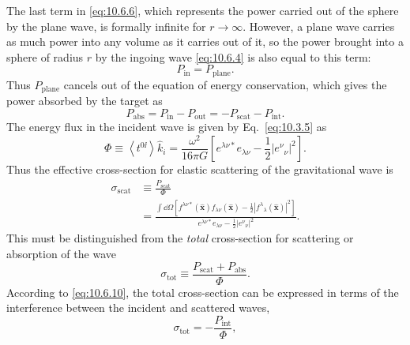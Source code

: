 The last term in \eqref{eq:10.6.6}, which represents the power carried out
of the sphere by the plane wave, is formally infinite for \(r\to\infty\).
However, a plane wave carries as much power into any volume as it carries out
of it, so the power brought into a sphere of radius \(r\) by the ingoing wave
\eqref{eq:10.6.4} is also equal to this term:
\begin{equation}
  P_{\mathrm{in}}=P_{\mathrm{plane}}.
  \tag{10.6.9}\label{eq:10.6.9}
\end{equation}
Thus \(P_{\mathrm{plane}}\) cancels out of the equation of energy conservation,
which gives the power absorbed by the target as
\begin{equation}
  P_{\mathrm{abs}}
  =
  P_{\mathrm{in}}-P_{\mathrm{out}}
  =
  -P_{\mathrm{scat}}-P_{\mathrm{int}}.
  \tag{10.6.10}\label{eq:10.6.10}
\end{equation}
The energy flux in the incident wave is given by Eq.~\eqref{eq:10.3.5} as
\begin{equation}
  \Phi
  \equiv
  \left\langle t^{0\ii}\right\rangle\widehat k_i
  =
  \frac{\omega^2}{16\pi G}
  \left[
    e^{\lambda\nu*}e_{\lambda\nu}
    -\frac12\left|e^\nu{}_\nu\right|^2
  \right].
  \tag{10.6.11}\label{eq:10.6.11}
\end{equation}
Thus the effective cross-section for elastic scattering of the gravitational
wave is
\begin{equation}
  \begin{split}
  \sigma_{\mathrm{scat}}
  &\equiv\frac{P_{\mathrm{scat}}}{\Phi}\\
  &=
  \frac{
    \displaystyle\int \dd\Omega
    \left[
      f^{\lambda\nu*}(\widehat{\mathbf{x}})
      f_{\lambda\nu}(\widehat{\mathbf{x}})
      -\frac12
      \left|f^\lambda{}_\lambda(\widehat{\mathbf{x}})\right|^2
    \right]
  }{
    \displaystyle
    e^{\lambda\nu*}e_{\lambda\nu}
    -\frac12\left|e^\nu{}_\nu\right|^2
  }.
  \end{split}
  \tag{10.6.12}\label{eq:10.6.12}
\end{equation}
This must be distinguished from the \emph{total} cross-section for scattering
or absorption of the wave
\begin{equation}
  \sigma_{\mathrm{tot}}
  \equiv
  \frac{P_{\mathrm{scat}}+P_{\mathrm{abs}}}{\Phi}.
  \tag{10.6.13}\label{eq:10.6.13}
\end{equation}
According to \eqref{eq:10.6.10}, the total cross-section can be expressed in
terms of the interference between the incident and scattered waves,
\begin{equation}
  \sigma_{\mathrm{tot}}=-\frac{P_{\mathrm{int}}}{\Phi},
  \tag{10.6.14}\label{eq:10.6.14}
\end{equation}
